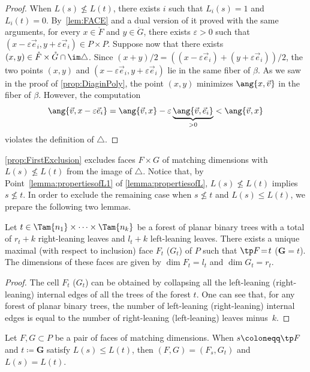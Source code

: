 \begin{proof}
When $L(s)\not\leq L(t)$, there exists $i$ such that $L_i(s) = 1$ and $L_i(t) = 0$.
By~\cref{lem:FACE} and a dual version of it proved with the same arguments,
for every $x\in \mathring{F}$ and $y\in \mathring{G}$, there exists $\varepsilon>0$ such that $(x-\varepsilon \vec e_i, y+\varepsilon \vec e_i) \in P\times P$.
Suppose now that there exists $(x,y)\in \mathring{F}\times \mathring{G} \cap \im \triangle$.
Since $(x+y)/2 = ((x-\varepsilon\vec e_i)+(y+\varepsilon\vec e_i))/2$, the two points $(x, y)$ and $(x-\varepsilon\vec e_i, y+\varepsilon\vec e_i)$ lie in the same fiber of $\beta$. As we saw in the proof of
\cref{prop:DiaginPoly}, the point $(x,y)$ minimizes $\ang{x, \vec v}$ in the fiber of $\beta$.
However, the computation
\[
\ang{\vec v, x-\varepsilon \vec e_i}=\ang{\vec v, x}-\varepsilon\underbrace{\ang{\vec v, \vec e_i}}_{>0}
<\ang{\vec v, x}
\]
violates the definition of $\triangle$.
\end{proof}

\cref{prop:FirstExclusion} excludes
faces $F\times G$ of matching dimensions with $L(s)\not\leq L(t)$
from the image of $\triangle$.
Notice that, by Point~\eqref{lemma:propertiesofL1} of \cref{lemma:propertiesofL}, $L(s)\not\leq L(t)$ implies $s\not \leq t$.
In order to exclude the remaining case when $s\not\leq t$ and $L(s)\leq L(t)$, we prepare the following two lemmas.

\begin{lemma}\label{lem:UniqueFG}
Let $t\in \Tam{n_1}\times \cdots \times \Tam{n_k}$ be a forest of planar binary trees with a total of $r_t+k$ right-leaning leaves and $l_t+k$ left-leaning leaves. There exists a unique maximal (with respect to inclusion) face $F_t$ (\resp $G_t$) of $P$ such that \hbox{$\tp F\!=\!t$} (\resp $\bm G = t$). The dimensions of these faces are given by $\dim F_t =l_t$ and $\dim G_t = r_t$.
\end{lemma}

\begin{proof}
The cell $F_t$ (\resp $G_t$) can be obtained by collapsing all the left-leaning (\resp right-leaning) internal edges of all the trees of the forest $t$. One can see that, for any forest of planar binary trees, the number of left-leaning (\resp right-leaning) internal edges is equal to the number of right-leaning (\resp left-leaning) leaves minus~$k$.
\end{proof}

\begin{lemma}\label{lemma:Matching}
Let $F,G\subset P$ be a pair of faces of matching dimensions.
When $s\coloneqq \tp F$ and $t\coloneqq \bm G$ satisfy $L(s)\leq L(t)$, then $(F, G) = (F_s, G_t)$ and $L(s)=L(t)$.
\end{lemma}

